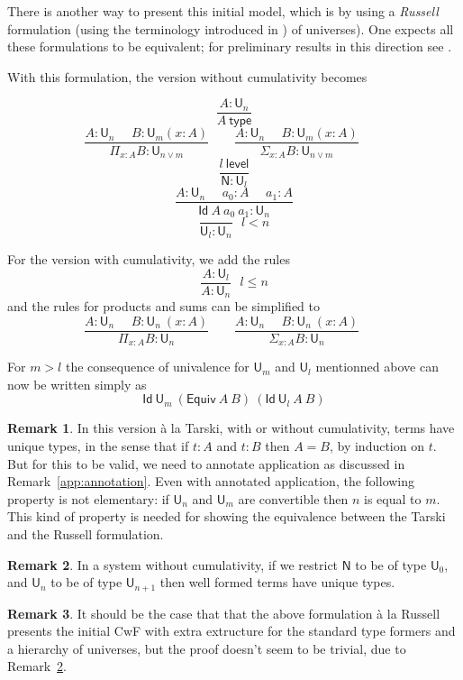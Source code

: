 \documentclass[11pt,a4paper]{article}
\theoremstyle{definition}
\newtheorem{remark}{Remark}
\newcommand{\Id}{\mathsf{Id}}
\newcommand{\NN}{\mathsf{N}}
\newcommand{\UU}{\mathsf{U}}
\newcommand{\Level}{\mathsf{level}}
\newcommand{\type}{\mathsf{type}}
\newcommand{\mypi}[3]{\Pi_{#1:#2}#3}
\newcommand{\mysig}[3]{\Sigma_{#1:#2}#3}
\newcommand{\Equiv}{\mathsf{Equiv}}
\begin{document}
\medskip

There is another way to present this initial model, which is by using
a {\em Russell} formulation (using the terminology introduced in \cite{martinlof:padova}) of
universes). One expects all these formulations to be equivalent; for preliminary results in this
direction see \cite{Assaf14,Thire20}.

With this formulation, the version without cumulativity becomes

$$
\frac{A:\UU_{n}}{A~\type}
$$
$$
\frac{A:\UU_{n}~~~~~~B:\UU_m(x:A)}
     {\mypi{x}{A}{B}:\UU_{n\vee m}}~~~~~~~~~
\frac{A:\UU_{n}~~~~~~B:\UU_m(x:A)}
     {\mysig{x}{A}{B}:\UU_{n\vee m}}~~~~~~~~~
$$
$$\frac{l~\Level}{\NN:\UU_{l}}$$
$$
\frac{A:\UU_n~~~~~~a_0:A~~~~~~a_1:A}
{\Id~A~a_0~a_1:\UU_n}
$$
$$
\frac{}{{\UU_l}:\UU_{n}}{~~~l<n}
$$

\medskip

For the version with cumulativity, we add the rules
$$
\frac{A:\UU_{l}}{A:\UU_{n}}{~~~l\leqslant n}
$$
and the rules for products and sums can be simplified to
$$
\frac{A:\UU_{n}~~~~~~B:\UU_n~(x:A)}
     {\mypi{x}{A}{B}:\UU_{n}}~~~~~~~~~
\frac{A:\UU_{n}~~~~~~B:\UU_n~(x:A)}
     {\mysig{x}{A}{B}:\UU_{n}}~~~~~~~~~
$$

     For $m>l$ the consequence of univalence for $\UU_m$ and $\UU_l$ mentionned above can now be written
     simply as
     $$\Id~\UU_m~(\Equiv~A~B)~(\Id~\UU_l~A~B)$$



\begin{remark}
  In this version \`a la Tarski, with or without cumulativity, terms have unique types, in the sense that if $t : A$ and $t : B$ then $A = B$, by induction on $t$. But for this to be valid, we need to annotate application as discussed in Remark~\ref{app:annotation}.
  Even with annotated application, the following property is not elementary: if $\UU_n$ and $\UU_m$ are convertible then $n$ is equal to $m$. This kind of property is needed for showing the equivalence between the Tarski and the Russell formulation.
\end{remark}

\begin{remark} \label{uniqueness:without:cumulativity}
  In a system without cumulativity, if we restrict $\NN$ to be of type $\UU_0$, and $\UU_n$ to be of type $\UU_{n+1}$ then well formed terms have unique types.
\end{remark}

\begin{remark}
  It should be the case that that the above formulation \`a la Russell presents the initial CwF with extra extructure for the standard type formers and a hierarchy of universes, but the proof doesn't seem to be trivial, due to Remark~\ref{uniqueness:without:cumulativity}.
\end{remark}
\end{document}
